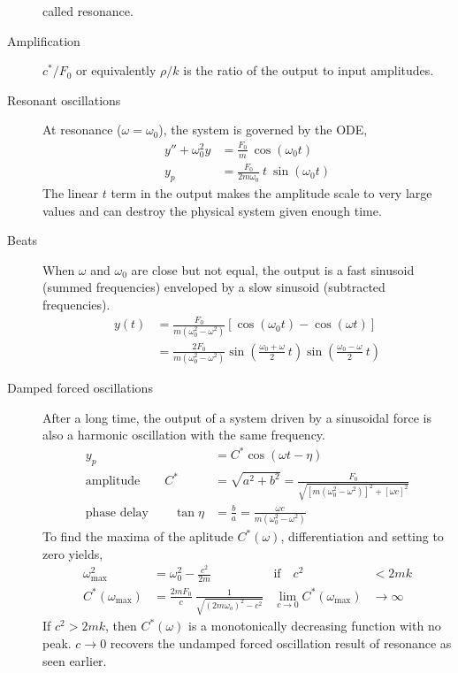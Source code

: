 \begin{description}
        called resonance. \par
    \item[Amplification] $ c^{*}/F_{0} $ or equivalently $ \rho / k $ is the ratio of the output
        to input amplitudes.
    \item[Resonant oscillations] At resonance ($ \omega = \omega_{0} $), the system
        is governed by the ODE,
        \begin{align}
            y'' + \omega_{0}^{2}y & = \frac{F_{0}}{m}\ \cos(\omega_{0} t)               \\
            y_{p}                 & = \frac{F_{0}}{2m\omega_{0}}\ t\ \sin(\omega_{0} t)
        \end{align}
        The linear $ t $ term in the output makes the amplitude scale to very large values
        and can destroy the physical system given enough time.
    \item[Beats] When $ \omega $ and $ \omega_{0} $ are close but not equal, the output is a
        fast sinusoid (summed frequencies) enveloped by a slow sinusoid (subtracted frequencies).
        \begin{align}
            y(t) & = \frac{F_{0}}{m(\omega_{0}^{2} - \omega^{2})} [\cos(\omega_{0}t) - \cos(\omega t)] \\
                 & = \frac{2F_{0}}{m(\omega_{0}^{2} - \omega^{2})}
            \sin\left( \frac{\omega_{0} + \omega}{2}\ t \right)
            \sin\left( \frac{\omega_{0} - \omega}{2}\ t \right)
        \end{align}
    \item[Damped forced oscillations] After a long time, the output of a system driven by a
        sinusoidal force is also a harmonic oscillation with the same frequency.
        \begin{align}
            y_{p}                              & = C^{*}\cos(\omega t - \eta)                                                                        \\
            \text{amplitude}\qquad C^{*}       & = \sqrt{a^{2} + b^{2}} = \frac{F_{0}}{\sqrt{[m(\omega_{0}^{2} - \omega^{2})]^{2} + [\omega c]^{2}}} \\
            \text{phase delay}\qquad \tan \eta & = \frac{b}{a} = \frac{\omega c}{m(\omega_{0}^{2} - \omega^{2})}
        \end{align}
        To find the maxima of the aplitude $ C^{*}(\omega) $, differentiation and setting to zero
        yields,
        \begin{align}
            \omega_{\text{max}}^{2}    & = \omega_{0}^{2} - \frac{c^{2}}{2m}                              & \text{if} \quad c^{2} & < 2mk \\
            C^{*}(\omega_{\text{max}}) & = \frac{2mF_{0}}{c}\ \frac{1}{\sqrt{(2m\omega_{o})^{2} - c^{2}}}
                                       & \lim_{c \to 0} C^{*}(\omega_{\text{max}})                        & \to \infty
        \end{align}
        If $ c^{2} > 2mk $, then $ C^{*}(\omega) $ is a monotonically decreasing function with no
        peak. $ c \to 0 $ recovers the undamped forced oscillation result of resonance as
        seen earlier.
\end{description}

